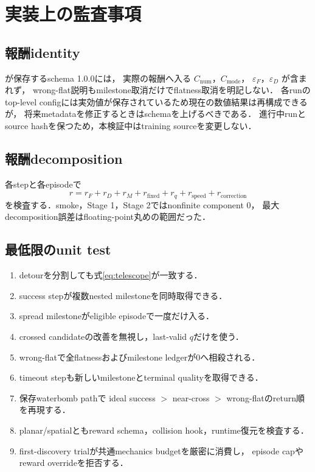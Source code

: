 \documentclass[a4paper,11pt]{ltjsarticle}
\newcommand{\Code}[1]{\texttt{\detokenize{#1}}}
\begin{document}
\section{実装上の監査事項}
\label{sec:audit}

\subsection{報酬identity}

\Code{reward_parameters()}が保存するschema 1.0.0には，
実際の報酬へ入る $C_{\mathrm{num}}$，$C_{\mathrm{mode}}$，
$\varepsilon_F$，$\varepsilon_D$ が含まれず，
wrong-flat説明もmilestone取消だけでflatness取消を明記しない．
各runのtop-level configには実効値が保存されているため現在の数値結果は再構成できるが，
将来metadataを修正するときはschemaを上げるべきである．
進行中runとsource hashを保つため，本検証中はtraining sourceを変更しない．

\subsection{報酬decomposition}

各stepと各episodeで
\begin{equation}
 r=
 r_F+r_D+r_M+r_{\mathrm{fixed}}+r_q+r_{\mathrm{speed}}
 +r_{\mathrm{correction}}
\end{equation}
を検査する．smoke，Stage 1，Stage 2ではnonfinite component 0，
最大decomposition誤差はfloating-point丸めの範囲だった．

\subsection{最低限のunit test}

\begin{enumerate}
 \item detourを分割しても式\eqref{eq:telescope}が一致する．
 \item success stepが複数nested milestoneを同時取得できる．
 \item spread milestoneがeligible episodeで一度だけ入る．
 \item crossed candidateの改善を無視し，last-valid $q$だけを使う．
 \item wrong-flatで全flatnessおよびmilestone ledgerが0へ相殺される．
 \item timeout stepも新しいmilestoneとterminal qualityを取得できる．
 \item 保存waterbomb pathで
 ideal success $>$ near-cross $>$ wrong-flatのreturn順を再現する．
 \item planar/spatialともreward schema，collision hook，runtime復元を検査する．
 \item first-discovery trialが共通mechanics budgetを厳密に消費し，
 episode capやreward overrideを拒否する．
\end{enumerate}
\end{document}
